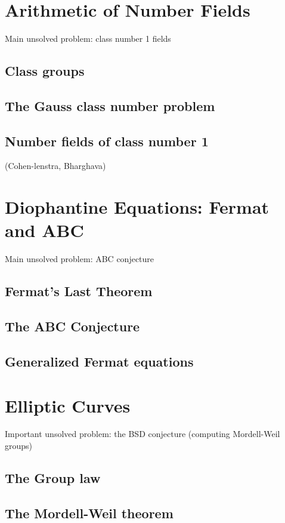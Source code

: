 \documentclass{book}
\begin{document}
\chapter{Arithmetic of Number Fields}
Main unsolved problem: class number 1 fields

\section{Class groups}
\section{The Gauss class number problem}
\section{Number fields of class number 1}
 (Cohen-lenstra, Bharghava)



\chapter{Diophantine Equations: Fermat and ABC}
Main unsolved problem: ABC conjecture

\section{Fermat's Last Theorem}
\section{The ABC Conjecture}
\section{Generalized Fermat equations}



\chapter{Elliptic Curves}
Important unsolved problem: the BSD conjecture (computing Mordell-Weil groups)

\section{The Group law}
\section{The Mordell-Weil theorem}
\end{document}
